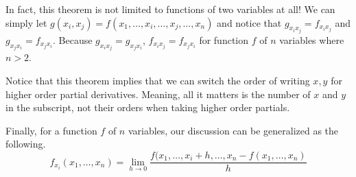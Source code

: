 \documentclass[../../../main.tex]{subfiles}
\begin{document}
In fact, this theorem is not limited to functions of two variables
at all! We can simply let $g(x_i, x_j) = f(x_1, \ldots, x_i, \ldots,
x_j, \ldots, x_n)$ and notice that $g_{x_i x_j} = f_{x_i x_j}$ and
$g_{x_j x_i} = f_{x_j x_i}$. Because $g_{x_i x_j} = g_{x_j x_i}$,
$f_{x_i x_j} = f_{x_j x_i}$ for function $f$ of $n$ variables where
$n > 2$.

Notice that this theorem implies that we can switch the order of
writing $x,y$ for higher order partial derivatives. Meaning,
all it matters is the number of $x$ and $y$ in the subscript,
not their orders when taking higher order partials.

\begin{important}
Finally, for a function $f$ of $n$ variables, our discussion can
be generalized as the following.
\[
f_{x_i} (x_1, \ldots, x_n)
= \lim_{h \to 0} \frac{
    f(x_1, \ldots, x_i + h, \ldots, x_n - f(x_1, \ldots, x_n)
}{h}
\]
\end{important}
\end{document}
